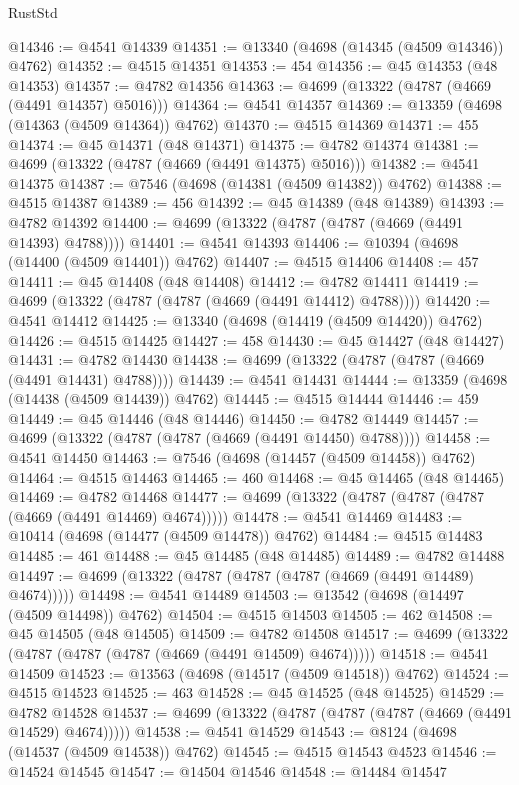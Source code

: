 \begin{lexlean}{RustStd}
\begin{coremodule}
@14346 := @4541 @14339
@14351 := @13340 (@4698 (@14345 (@4509 @14346)) @4762)
@14352 := @4515 @14351
@14353 := 454
@14356 := @45 @14353 (@48 @14353)
@14357 := @4782 @14356
@14363 := @4699 (@13322 (@4787 (@4669 (@4491 @14357) @5016)))
@14364 := @4541 @14357
@14369 := @13359 (@4698 (@14363 (@4509 @14364)) @4762)
@14370 := @4515 @14369
@14371 := 455
@14374 := @45 @14371 (@48 @14371)
@14375 := @4782 @14374
@14381 := @4699 (@13322 (@4787 (@4669 (@4491 @14375) @5016)))
@14382 := @4541 @14375
@14387 := @7546 (@4698 (@14381 (@4509 @14382)) @4762)
@14388 := @4515 @14387
@14389 := 456
@14392 := @45 @14389 (@48 @14389)
@14393 := @4782 @14392
@14400 := @4699 (@13322 (@4787 (@4787 (@4669 (@4491 @14393) @4788))))
@14401 := @4541 @14393
@14406 := @10394 (@4698 (@14400 (@4509 @14401)) @4762)
@14407 := @4515 @14406
@14408 := 457
@14411 := @45 @14408 (@48 @14408)
@14412 := @4782 @14411
@14419 := @4699 (@13322 (@4787 (@4787 (@4669 (@4491 @14412) @4788))))
@14420 := @4541 @14412
@14425 := @13340 (@4698 (@14419 (@4509 @14420)) @4762)
@14426 := @4515 @14425
@14427 := 458
@14430 := @45 @14427 (@48 @14427)
@14431 := @4782 @14430
@14438 := @4699 (@13322 (@4787 (@4787 (@4669 (@4491 @14431) @4788))))
@14439 := @4541 @14431
@14444 := @13359 (@4698 (@14438 (@4509 @14439)) @4762)
@14445 := @4515 @14444
@14446 := 459
@14449 := @45 @14446 (@48 @14446)
@14450 := @4782 @14449
@14457 := @4699 (@13322 (@4787 (@4787 (@4669 (@4491 @14450) @4788))))
@14458 := @4541 @14450
@14463 := @7546 (@4698 (@14457 (@4509 @14458)) @4762)
@14464 := @4515 @14463
@14465 := 460
@14468 := @45 @14465 (@48 @14465)
@14469 := @4782 @14468
@14477 := @4699 (@13322 (@4787 (@4787 (@4787 (@4669 (@4491 @14469) @4674)))))
@14478 := @4541 @14469
@14483 := @10414 (@4698 (@14477 (@4509 @14478)) @4762)
@14484 := @4515 @14483
@14485 := 461
@14488 := @45 @14485 (@48 @14485)
@14489 := @4782 @14488
@14497 := @4699 (@13322 (@4787 (@4787 (@4787 (@4669 (@4491 @14489) @4674)))))
@14498 := @4541 @14489
@14503 := @13542 (@4698 (@14497 (@4509 @14498)) @4762)
@14504 := @4515 @14503
@14505 := 462
@14508 := @45 @14505 (@48 @14505)
@14509 := @4782 @14508
@14517 := @4699 (@13322 (@4787 (@4787 (@4787 (@4669 (@4491 @14509) @4674)))))
@14518 := @4541 @14509
@14523 := @13563 (@4698 (@14517 (@4509 @14518)) @4762)
@14524 := @4515 @14523
@14525 := 463
@14528 := @45 @14525 (@48 @14525)
@14529 := @4782 @14528
@14537 := @4699 (@13322 (@4787 (@4787 (@4787 (@4669 (@4491 @14529) @4674)))))
@14538 := @4541 @14529
@14543 := @8124 (@4698 (@14537 (@4509 @14538)) @4762)
@14545 := @4515 @14543 @4523
@14546 := @14524 @14545
@14547 := @14504 @14546
@14548 := @14484 @14547

\end{coremodule}
\end{lexlean}

